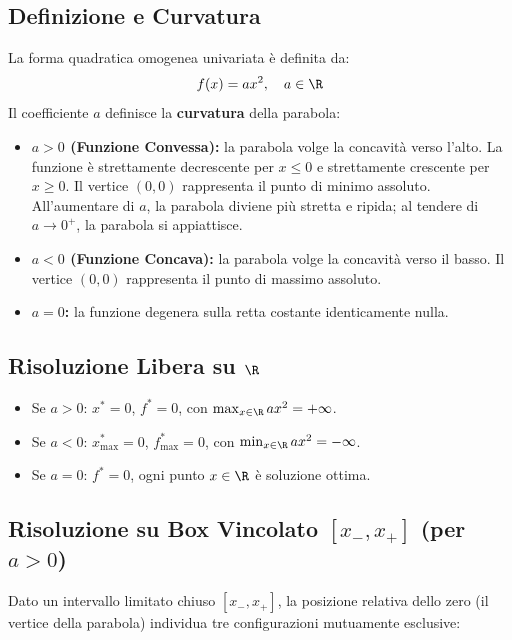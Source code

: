 \subsection{Definizione e Curvatura}
La forma quadratica omogenea univariata \`e definita da:
\begin{equation}
f(x) = ax^2, \quad a \in \R
\end{equation}
Il coefficiente $a$ definisce la \textbf{curvatura} della parabola:
\begin{itemize}
    \item \textbf{$a > 0$ (Funzione Convessa):} la parabola volge la concavit\`a verso l'alto. La funzione \`e strettamente decrescente per $x \le 0$ e strettamente crescente per $x \ge 0$. Il vertice $(0, 0)$ rappresenta il punto di minimo assoluto. All'aumentare di $a$, la parabola diviene pi\`u stretta e ripida; al tendere di $a \to 0^+$, la parabola si appiattisce.
    \item \textbf{$a < 0$ (Funzione Concava):} la parabola volge la concavit\`a verso il basso. Il vertice $(0, 0)$ rappresenta il punto di massimo assoluto.
    \item \textbf{$a = 0$:} la funzione degenera sulla retta costante identicamente nulla.
\end{itemize}

\subsection[Risoluzione Libera su R]{Risoluzione Libera su $\R$}
\begin{itemize}
    \item Se $a > 0$: $x^* = 0$, $f^* = 0$, con $\max_{x \in \R} ax^2 = +\infty$.
    \item Se $a < 0$: $x^*_{\max} = 0$, $f^*_{\max} = 0$, con $\min_{x \in \R} ax^2 = -\infty$.
    \item Se $a = 0$: $f^* = 0$, ogni punto $x \in \R$ \`e soluzione ottima.
\end{itemize}

\subsection[Risoluzione su Box Vincolato]{Risoluzione su Box Vincolato $[x_-, x_+]$ (per $a > 0$)}
Dato un intervallo limitato chiuso $[x_-, x_+]$, la posizione relativa dello zero (il vertice della parabola) individua tre configurazioni mutuamente esclusive:

